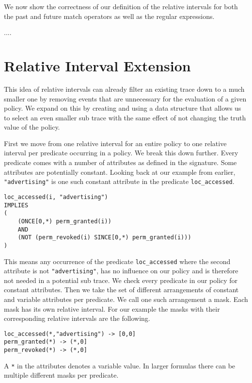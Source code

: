 We now show the correctness of our definition of the relative intervals for both the past and future match operators as well as the regular expressions.

....

\section{Relative Interval Extension}

This idea of relative intervals can already filter an existing trace down to a much smaller one by removing events that are unnecessary for the evaluation of a given policy.
We expand on this by creating and using a data structure that allows us to select an even smaller sub trace with the same effect of not changing the truth value of the policy.

First we move from one relative interval for an entire policy to one relative interval per predicate occurring in a policy.
We break this down further.
Every predicate comes with a number of attributes as defined in the signature.
Some attributes are potentially constant.
Looking back at our example from earlier, \texttt{"advertising"} is one such constant attribute in the predicate \texttt{loc\_accessed}.

\begin{verbatim}
loc_accessed(i, "advertising") 
IMPLIES 
(
    (ONCE[0,*) perm_granted(i)) 
    AND 
    (NOT (perm_revoked(i) SINCE[0,*) perm_granted(i)))
)
\end{verbatim}

This means any occurrence of the predicate \texttt{loc\_accessed} where the second attribute is not \texttt{"advertising"}, has no influence on our policy and is therefore not needed in a potential sub trace.
We check every predicate in our policy for constant attributes.
Then we take the set of different arrangements of constant and variable attributes per predicate.
We call one such arrangement a mask.
Each mask has its own relative interval.
For our example the masks with their corresponding relative intervals are the following.

\begin{verbatim}
loc_accessed(*,"advertising") -> [0,0]
perm_granted(*) -> (*,0]
perm_revoked(*) -> (*,0]
\end{verbatim}

A \texttt{*} in the attributes denotes a variable value.
In larger formulas there can be multiple different masks per predicate.


